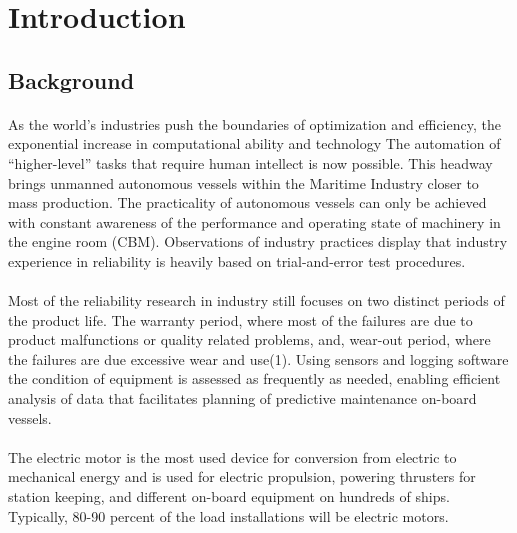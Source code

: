 \section{Introduction}
\label{sec:introduction}
\subsection{Background}
\paragraph{}As the world’s industries push the boundaries of optimization and efficiency, the exponential increase in computational ability and technology The automation of “higher-level” tasks that require human intellect is now possible. This headway brings unmanned autonomous vessels within the Maritime Industry closer to mass production. The practicality of autonomous vessels can only be achieved with constant awareness of the performance and operating state of machinery in the engine room (CBM).  Observations of industry practices display that industry experience in reliability is heavily based on trial-and-error test procedures. 

\paragraph{}Most of the reliability research in industry still focuses on two distinct periods of the product life. The warranty period, where most of the failures are due to product malfunctions or quality related problems, and, wear-out period, where the failures are due excessive wear and use(1). Using sensors and logging software the condition of equipment is assessed as  frequently as needed, enabling efficient analysis of data that facilitates planning of predictive maintenance on-board vessels. 
\paragraph{}The  electric motor is the most used device for conversion from electric to mechanical energy and is used for electric propulsion,  powering thrusters for station keeping, and different on-board equipment on hundreds of ships. Typically, 80-90 percent of the load installations will be electric motors.\cite{noauthor_all_2019}

